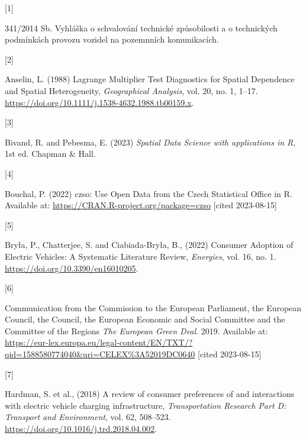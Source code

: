 \documentclass{mmeproc}
\newlength{\cslhangindent}
\newlength{\csllabelwidth}
\newenvironment{CSLReferences}[2] %
 {%
  \setlength{\parindent}{0pt}
  \ifodd #1
  \fi
  \setlength{\parskip}{-2pt}
 }%
 {}
\newcommand{\CSLLeftMargin}[1]{\parbox[t]{\csllabelwidth}{#1}}
\newcommand{\CSLRightInline}[1]{\parbox[t]{\linewidth - \csllabelwidth}{#1}\break}
\begin{document}
\hfill

\hypertarget{refs}{}
\begin{CSLReferences}{0}{0}

\leavevmode{}%
\CSLLeftMargin{{[}1{]} }%
\CSLRightInline{{341/2014 {Sb}. {Vyhláška} o schvalování technické
způsobilosti a o technických podmínkách provozu vozidel na pozemnních
komunikacích.} }

\leavevmode{}%
\CSLLeftMargin{{[}2{]} }%
\CSLRightInline{Anselin, L. (1988) {Lagrange {Multiplier} {Test}
{Diagnostics} for {Spatial} {Dependence} and {Spatial}
{Heterogeneity},} \emph{Geographical Analysis}, vol. 20, no. 1,
1--17. \url{https://doi.org/10.1111/j.1538-4632.1988.tb00159.x}.}

\leavevmode{}%
\CSLLeftMargin{{[}3{]} }%
\CSLRightInline{Bivand, R. and Pebesma, E. (2023) \emph{Spatial {Data} {Science}
with applications in {R}}, 1st ed. Chapman \& Hall.}

\leavevmode{}%
\CSLLeftMargin{{[}4{]} }%
\CSLRightInline{Bouchal, P. (2022) {{czso}: {Use} {Open} {Data} from the
{Czech} {Statistical} {Office} in {R}.} Available at:
\url{https://CRAN.R-project.org/package=czso} {{[}cited 2023-08-15{]}}}

\leavevmode{}%
\CSLLeftMargin{{[}5{]} }%
\CSLRightInline{Bryła, P., Chatterjee, S. and Ciabiada-Bryła, B., (2022)
{Consumer {Adoption} of {Electric} {Vehicles}: {A} {Systematic}
{Literature} {Review},} \emph{Energies}, vol. 16, no. 1.
\url{https://doi.org/10.3390/en16010205}.}

\leavevmode{}%
\CSLLeftMargin{{[}6{]} }%
\CSLRightInline{{Communication from the {Commission} to the {European}
{Parliament}, the {European} {Council}, the {Council}, the {European}
{Economic} and {Social} {Committee} and the {Committee} of the {Regions} \emph{{The} {European} {Green} {Deal}}.} 2019. Available at:
\url{https://eur-lex.europa.eu/legal-content/EN/TXT/?qid=1588580774040\&uri=CELEX\%3A52019DC0640} {{[}cited 2023-08-15{]}}}

\leavevmode{}%
\CSLLeftMargin{{[}7{]} }%
\CSLRightInline{Hardman, S. et al., (2018) {A review of consumer
preferences of and interactions with electric vehicle charging
infrastructure,} \emph{Transportation Research Part D: Transport and
Environment}, vol. 62, 508--523. \url{https://doi.org/10.1016/j.trd.2018.04.002}.}


\end{CSLReferences}
\end{document}
